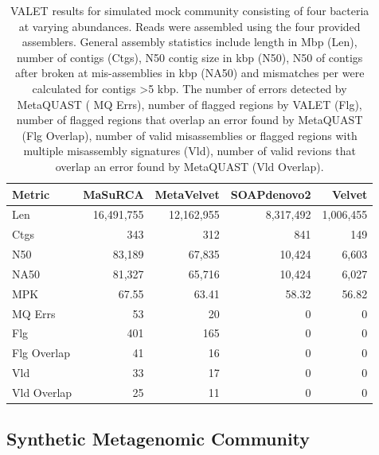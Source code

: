 \documentclass{article}
\begin{document}
\begin{table}

\caption{VALET results for simulated mock community consisting of four bacteria at varying abundances. Reads were assembled using the four provided assemblers. General assembly statistics include length in Mbp (Len), number of contigs (Ctgs), N50 contig size in kbp (N50), N50 of contigs after broken at mis-assemblies in kbp (NA50) and mismatches per  were calculated for contigs \textgreater 5 kbp. The number of errors detected by MetaQUAST ( MQ Errs), number of flagged regions by VALET (Flg), number of flagged regions that overlap an error found by MetaQUAST (Flg Overlap), number of valid misassemblies or flagged regions with multiple misassembly signatures (Vld), number of valid revions that overlap an error found by MetaQUAST (Vld Overlap).\label{mock_comp_tbl}}
\begin{tabular}{lrrrr}
\toprule
Metric & MaSuRCA & MetaVelvet & SOAPdenovo2 & Velvet\\
\midrule
Len & 16,491,755 & 12,162,955 & 8,317,492 & 1,006,455\\
Ctgs & 343 & 312 & 841 & 149\\
N50 & 83,189 & 67,835 & 10,424 & 6,603\\
NA50 & 81,327 & 65,716 & 10,424 & 6,027\\
MPK & 67.55 & 63.41 & 58.32 & 56.82\\
\addlinespace
MQ Errs & 53 & 20 & 0 & 0\\
Flg & 401 & 165 & 0 & 0\\
Flg Overlap & 41 & 16 & 0 & 0\\
Vld & 33 & 17 & 0 & 0\\
Vld Overlap & 25 & 11 & 0 & 0\\
\bottomrule
\end{tabular}
\end{table}
\subsection{Synthetic Metagenomic Community}
\end{document}
